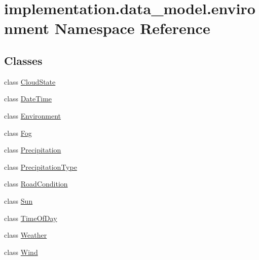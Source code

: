\hypertarget{namespaceimplementation_1_1data__model_1_1environment}{}\section{implementation.\+data\+\_\+model.\+environment Namespace Reference}
\label{namespaceimplementation_1_1data__model_1_1environment}
\subsection*{Classes}
\begin{DoxyCompactItemize}
\item 
class \hyperlink{classimplementation_1_1data__model_1_1environment_1_1_cloud_state}{Cloud\+State}
\item 
class \hyperlink{classimplementation_1_1data__model_1_1environment_1_1_date_time}{Date\+Time}
\item 
class \hyperlink{classimplementation_1_1data__model_1_1environment_1_1_environment}{Environment}
\item 
class \hyperlink{classimplementation_1_1data__model_1_1environment_1_1_fog}{Fog}
\item 
class \hyperlink{classimplementation_1_1data__model_1_1environment_1_1_precipitation}{Precipitation}
\item 
class \hyperlink{classimplementation_1_1data__model_1_1environment_1_1_precipitation_type}{Precipitation\+Type}
\item 
class \hyperlink{classimplementation_1_1data__model_1_1environment_1_1_road_condition}{Road\+Condition}
\item 
class \hyperlink{classimplementation_1_1data__model_1_1environment_1_1_sun}{Sun}
\item 
class \hyperlink{classimplementation_1_1data__model_1_1environment_1_1_time_of_day}{Time\+Of\+Day}
\item 
class \hyperlink{classimplementation_1_1data__model_1_1environment_1_1_weather}{Weather}
\item 
class \hyperlink{classimplementation_1_1data__model_1_1environment_1_1_wind}{Wind}
\end{DoxyCompactItemize}
